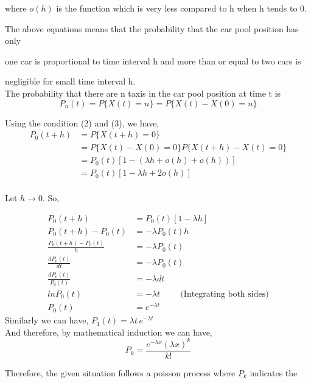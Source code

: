\documentclass{article}
\begin{document}
where $o(h)$  is the function which is very less compared to h when h tends to 0.

The above equations means that the probability that the car pool position has only

one car is proportional to time interval h and more than or equal to two cars is 

negligible for small time interval h. \\

The probability that there are n taxis in the car pool position at time t is
\[P_n(t) = P\{X(t) = n\} = P\{X(t) - X(0) = n\}\]

Using the condition (2) and (3), we have, 
\begin{equation*}
    \begin{split}
        P_0(t+h) &= P\{X(t+h) = 0\} \\ 
        &= P\{X(t) - X(0) = 0\}P\{X(t+h) - X(t) = 0\} \\
        &= P_0(t)[1 - (\lambda h + o(h) + o(h))] \\
        &= P_0(t)[1 - \lambda h + 2o(h)] \\
    \end{split}
\end{equation*}

Let $ h \rightarrow 0$. So,

\begin{equation*}
    \begin{split}
        P_0(t+h) &= P_0(t)[1 - \lambda h] \\
        P_0(t+h) - P_0(t) &= - \lambda P_0(t) h \\
        \frac{P_0(t+h) - P_0(t)}{h} &= - \lambda P_0(t) \\
        \frac{d P_0(t)}{dt} &= - \lambda P_0(t) \\ 
        \frac{d P_0(t)}{P_0(t)} &= - \lambda dt \\
        ln P_0(t) &= - \lambda t \hspace{1cm} \text{(Integrating both sides)}\\
        P_0(t) &= e^{- \lambda t} 
    \end{split}
\end{equation*}
\newpage
Similarly we can have, $P_1(t) = \lambda t \, e^{- \lambda t}$ \\ 

And therefore, by mathematical induction we can have,
\[P_k = \frac{e^{- \lambda x}(\lambda x)^k}{k!}\] 

Therefore, the given situation follows a poisson process where $P_k$ indicates the
\end{document}
